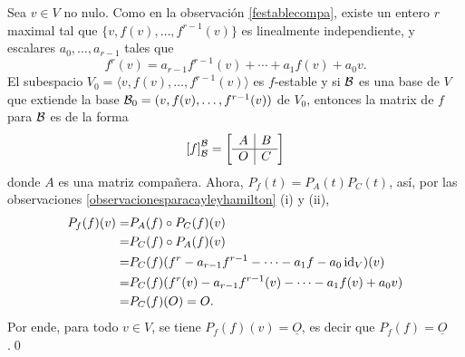 \dem Sea $v\in V$ no nulo. Como en la observación \ref{festablecompa}, existe un entero $r$ maximal tal que $\{v,f(v),\ldots,f^{r-1}(v)\}$ es linealmente independiente, y escalares $a_0,\ldots,a_{r-1}$ tales que
$$f^r(v)=a_{r-1}f^{r-1}(v)+\cdots+a_{1}f(v)+a_0v.$$
El subespacio $V_0=\langle v,f(v),\ldots,f^{r-1}(v)\rangle$ es $f$-estable y si $\mathcal{B}$ es una base de $V$ que extiende la base $\mathcal{B}_0=(v,f(v),\ldots,f^{r-1}(v))$ de $V_0$, entonces la matrix de $f$ para $\mathcal{B}$ es de la forma
$$
  \left[f\right]_{\mathcal{B}}^{\mathcal{B}}=\left[\begin{array}{c|c}
    A & B\\
    \hline
    O & C
  \end{array}\right]
$$
donde $A$ es una matriz compañera. Ahora, $P_f(t)=P_A(t)P_C(t)$, así, por las observaciones \ref{observacionesparacayleyhamilton} (i) y (ii),
\begin{align*}
  P_f(f)(v) = & P_A(f)\circ P_C(f)(v)\\
   = & P_C(f)\circ P_A(f)(v)\\
   = & P_C(f)(f^r-a_{r-1}f^{r-1}-\cdots-a_1f-a_0\operatorname{id}_V)(v)\\
   = & P_C(f)(f^r(v)-a_{r-1}f^{r-1}(v)-\cdots-a_{1}f(v)+a_0v)\\
   = & P_C(f)(O)=O.
\end{align*}
Por ende, para todo $v\in V$, se tiene $P_f(f)(v)=\underline{O}$, es decir que $P_f(f)=\underline{O}$.\qed

